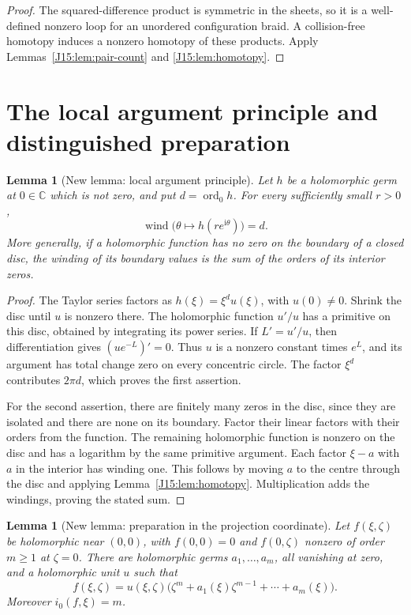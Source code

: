 \documentclass[11pt,oneside]{report}
\newtheorem{lemma}[theorem]{Lemma}
\theoremstyle{definition}
\numberwithin{equation}{section}
\newcommand{\C}{\mathbb C}
\newcommand{\ord}{\operatorname{ord}}
\newcommand{\wind}{\operatorname{wind}}
\newcommand{\ii}{\mathrm i}
\begin{document}
\begin{proof}
The squared-difference product is symmetric in the sheets, so it is a
well-defined nonzero loop for an unordered configuration braid. A
collision-free homotopy induces a nonzero homotopy of these products.
Apply Lemmas~\ref{J15:lem:pair-count} and \ref{J15:lem:homotopy}.
\end{proof}

\section{The local argument principle and distinguished preparation}

\begin{lemma}[New lemma: local argument principle]
\label{J15:lem:local-principle}
Let $h$ be a holomorphic germ at $0\in\C$ which is not zero, and put
$d=\ord_0h$. For every sufficiently small $r>0$,
\[
 \wind\bigl(\theta\longmapsto h(r e^{\ii\theta})\bigr)=d.
\]
More generally, if a holomorphic function has no zero on the boundary of a
closed disc, the winding of its boundary values is the sum of the orders
of its interior zeros.
\end{lemma}

\begin{proof}
The Taylor series factors as $h(\xi)=\xi^d u(\xi)$, with $u(0)\ne0$.
Shrink the disc until $u$ is nonzero there. The holomorphic function $u'/u$
has a primitive on this disc, obtained by integrating its power series.
If $L'=u'/u$, then differentiation gives $(u e^{-L})'=0$.
Thus $u$ is a nonzero constant times $e^L$, and its argument has total
change zero on every concentric circle. The factor $\xi^d$ contributes
$2\pi d$, which proves the first assertion.

For the second assertion, there are finitely many zeros in the disc,
since they are isolated and there are none on its boundary. Factor their
linear factors with their orders from the function. The remaining
holomorphic function is nonzero on the disc and has a logarithm by the
same primitive argument. Each factor $\xi-a$ with $a$ in the interior
has winding one. This follows by moving $a$ to the centre through the
disc and applying Lemma~\ref{J15:lem:homotopy}. Multiplication adds the
windings, proving the stated sum.
\end{proof}

\begin{lemma}[New lemma: preparation in the projection coordinate]
\label{J15:lem:preparation}
Let $f(\xi,\zeta)$ be holomorphic near $(0,0)$, with $f(0,0)=0$
and $f(0,\zeta)$ nonzero of order $m\ge1$ at $\zeta=0$.
There are holomorphic germs $a_1,\ldots,a_m$, all vanishing at zero,
and a holomorphic unit $u$ such that
\begin{equation}\label{J15:eq:preparation}
 f(\xi,\zeta)=u(\xi,\zeta)
       \bigl(\zeta^m+a_1(\xi)\zeta^{m-1}+\cdots+a_m(\xi)\bigr).
\end{equation}
Moreover $i_0(f,\xi)=m$.
\end{lemma}
\end{document}
